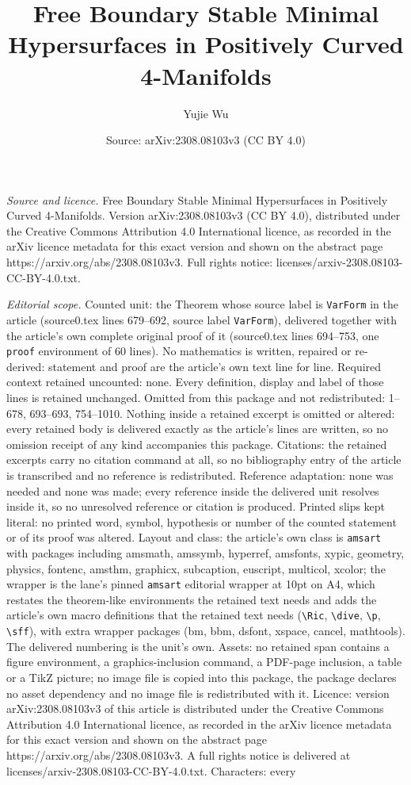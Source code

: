 \documentclass[10pt,a4paper]{amsart}
\title[Free Boundary Stable Minimal Hypersurfaces in Positively Cur]{Free Boundary Stable Minimal Hypersurfaces in Positively Curved 4-Manifolds}
\author{Yujie Wu}
\date{Source: arXiv:2308.08103v3 (CC BY 4.0)}
\begin{document}
\maketitle

\noindent\emph{Source and licence.} Free Boundary Stable Minimal Hypersurfaces in Positively Curved 4-Manifolds. Version arXiv:2308.08103v3 (CC BY 4.0), distributed under the Creative Commons Attribution 4.0 International licence, as recorded in the arXiv licence metadata for this exact version and shown on the abstract page https://arxiv.org/abs/2308.08103v3. Full rights notice: licenses/arxiv-2308.08103-CC-BY-4.0.txt.\par\smallskip

\noindent\textit{Editorial scope.} Counted unit: the Theorem whose source label is \texttt{VarForm} in the article (source0.tex lines 679--692, source label \texttt{VarForm}), delivered together with the article's own complete original proof of it (source0.tex lines 694--753, one \texttt{proof} environment of 60 lines). No mathematics is written, repaired or re-derived: statement and proof are the article's own text line for line. Required context retained uncounted: none. Every definition, display and label of those lines is retained unchanged. Omitted from this package and not redistributed: 1--678, 693--693, 754--1010. Nothing inside a retained excerpt is omitted or altered: every retained body is delivered exactly as the article's lines are written, so no omission receipt of any kind accompanies this package. Citations: the retained excerpts carry no citation command at all, so no bibliography entry of the article is transcribed and no reference is redistributed. Reference adaptation: none was needed and none was made; every reference inside the delivered unit resolves inside it, so no unresolved reference or citation is produced. Printed slips kept literal: no printed word, symbol, hypothesis or number of the counted statement or of its proof was altered. Layout and class: the article's own class is \texttt{amsart} with packages including amsmath, amssymb, hyperref, amsfonts, xypic, geometry, physics, fontenc, amsthm, graphicx, subcaption, euscript, multicol, xcolor; the wrapper is the lane's pinned \texttt{amsart} editorial wrapper at 10pt on A4, which restates the theorem-like environments the retained text needs and adds the article's own macro definitions that the retained text needs (\texttt{\textbackslash Ric}, \texttt{\textbackslash dive}, \texttt{\textbackslash p}, \texttt{\textbackslash sff}), with extra wrapper packages (bm, bbm, dsfont, xspace, cancel, mathtools). The delivered numbering is the unit's own. Assets: no retained span contains a figure environment, a graphics-inclusion command, a PDF-page inclusion, a table or a TikZ picture; no image file is copied into this package, the package declares no asset dependency and no image file is redistributed with it. Licence: version arXiv:2308.08103v3 of this article is distributed under the Creative Commons Attribution 4.0 International licence, as recorded in the arXiv licence metadata for this exact version and shown on the abstract page https://arxiv.org/abs/2308.08103v3. A full rights notice is delivered at licenses/arxiv-2308.08103-CC-BY-4.0.txt. Characters: every 
\end{document}
